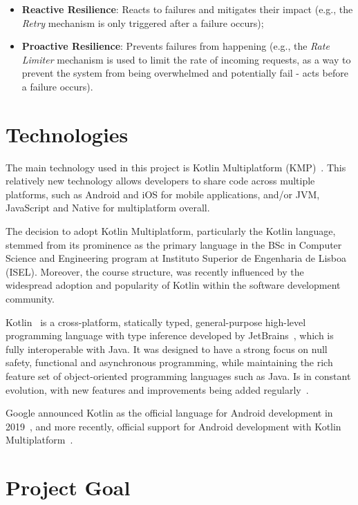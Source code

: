 \begin{itemize}
    \item \textbf{Reactive Resilience}: Reacts to failures and mitigates their impact (e.g., the \textit{Retry} mechanism is only triggered after a failure occurs);
    \item \textbf{Proactive Resilience}: Prevents failures from happening (e.g., the \textit{Rate Limiter} mechanism is used to limit the rate of incoming requests, as a way to prevent the system from being overwhelmed and potentially fail - acts before a failure occurs).
\end{itemize}


\section{Technologies}\label{sec:technologies}

The main technology used in this project is Kotlin Multiplatform (KMP)~\cite{kotlin-multiplatform}.
This relatively new technology allows developers to share code across multiple platforms, such as Android and iOS for mobile applications, and/or JVM, JavaScript and Native for multiplatform overall.

The decision to adopt Kotlin Multiplatform, particularly the Kotlin language, stemmed from its prominence as the primary language in the BSc in Computer Science and Engineering program at Instituto Superior de Engenharia de Lisboa (ISEL). Moreover, the course structure, was recently influenced by the widespread adoption and popularity of Kotlin within the software development community.

Kotlin~\cite{wiki:kotlin-programming-language} is a cross-platform, statically typed, general-purpose high-level programming language with type inference developed by JetBrains~\cite{jetbrains}, which is fully interoperable with Java.
It was designed to have a strong focus on null safety, functional and asynchronous programming, while maintaining the rich feature set of object-oriented programming languages such as Java.
Is in constant evolution, with new features and improvements being added regularly~\cite{kotlin-keep}.

Google announced Kotlin as the official language for Android development in 2019~\cite{wiki:kotlin-programming-language}, and more recently, official support for Android development with Kotlin Multiplatform~\cite{android-kotlin-multiplatform, google-kotlin-multiplatform}.


\section{Project Goal}\label{sec:project-goal}

